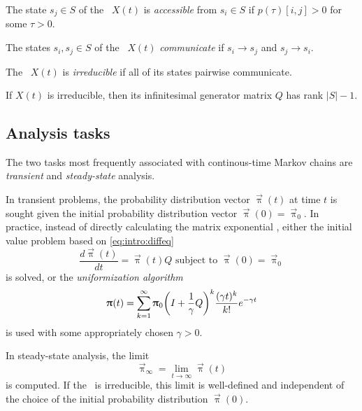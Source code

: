 \begin{dfn}
  The state $s_j \in S$ of the \ctmc\ $X(t)$ is \emph{accessible} from
  $s_i \in S$  if $p(\tau)[i, j] > 0$ for
  some $\tau > 0$.
\end{dfn}

\begin{dfn}
  The states $s_i, s_j \in S$ of the \ctmc\ $X(t)$ \emph{communicate}
   if $s_i \to s_j$ and
  $s_j \to s_i$.
\end{dfn}

\begin{dfn}
  The \ctmc\ $X(t)$ is \emph{irreducible} if all of its states pairwise
  communicate.
\end{dfn}

If $X(t)$ is irreducible, then its infinitesimal generator matrix $Q$
has rank $\lvert S \rvert - 1$.

\subsection*{Analysis tasks}

The two tasks most frequently associated with continous-time Markov
chains are \emph{transient} and \emph{steady-state} analysis.

In transient problems, the probability distribution vector
$\vec{\uppi}(t)$ at time $t$ is sought given the initial probability
distribution vector $\vec{\uppi}(0) = \vec{\uppi}_0$. In practice,
instead of directly calculating the matrix exponential
, either the initial value problem based on
\vref{eq:intro:diffeq}
\begin{equation}
  \frac{d \vec{\uppi}(t)}{dt} = \vec{\uppi}(t) Q \text{ subject
    to } \vec{\uppi}(0) = \vec{\uppi}_0 \label{eq:intro:diffeq-initial}
\end{equation}
is solved, or the \emph{uniformization algorithm}
\begin{equation}
  \vec{\uppi}(t) = \sum_{k = 1}^{\infty} \vec{\uppi}_0 \mleft( I +
  \frac{1}{\gamma} Q \mright)^k \frac{(\gamma t)^k}{k!} e^{-\gamma t}
\end{equation}
is used with some appropriately chosen $\gamma > 0$.

In steady-state analysis, the limit
\begin{equation}
  \vec{\uppi}_{\infty} = \lim_{t \to \infty} \vec{\uppi}(t)
\end{equation}
is computed. If the \ctmc\ is irreducible, this limit is well-defined
and independent of the choice of the initial probability distribution
$\vec{\uppi}(0)$.

